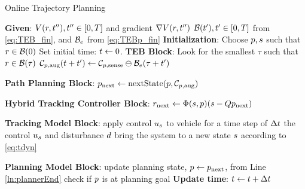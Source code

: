 \begin{algorithm}	
	\caption{Online Trajectory Planning}
	\label{alg:algOnline}
	\begin{algorithmic}[1]
		\STATE \textbf{Given}: \label{ln:gStart}
		\STATE $V(r, t''), t'' \in [0, T]$ and gradient $\nabla V(r, t'')$
 		\STATE $\mathcal B(t'), t' \in [0,T]$ from \eqref{eq:TEB_fin}, and $\mathcal B_e$ from \eqref{eq:TEBp_fin} \label{ln:gEnd}
    \STATE \textbf{Initialization}: \label{ln:Istart}
		\STATE Choose $p, s$ such that $r \in \mathcal B(0)$ 
    \STATE Set initial time: $t \leftarrow 0$. \label{ln:Iend}
		\STATE \textbf{TEB Block}: \label{ln:obsStart}
    \STATE Look for the smallest $\tau$ such that $r \in \mathcal B(\tau)$ \label{ln:infSkip}
		\STATE $\mathcal C_{p,\text{aug}}(t + t') \leftarrow \mathcal C_{p,\text{sense}} \ominus \mathcal B_e(\tau + t')$ \label{ln:obsEnd}
		
		\STATE \textbf{Path Planning Block}:\label{ln:plannerStart}
		\STATE $p_\text{next} \leftarrow \text{nextState}(p, \mathcal C_{p,\text{aug}})$\label{ln:plannerEnd}
		
		\STATE \textbf{Hybrid Tracking Controller Block}:\label{ln:controllerStart}
		\STATE $r_\text{next} \leftarrow \Phi(s,p)(s - Qp_\text{next})$
		
		\ELSE {} 
           \ENDIF \label{ln:controllerEnd}
		
		\STATE \textbf{Tracking Model Block}: \label{ln:trackingStart}
		\STATE apply control $u_s$ to vehicle for a time step of $\Delta t$
    \STATE the control $u_s$ and disturbance $d$ bring the system to a new state $s$ according to \eqref{eq:tdyn} \label{ln:trackingEnd}
		
		\STATE \textbf{Planning Model Block}:\label{ln:planningStart}
		\STATE update planning state, $p \leftarrow p_\text{next}$, from Line \ref{ln:plannerEnd}
		\STATE check if $p$ is at planning goal \label{ln:planningEnd}
    \STATE \textbf{Update time}:
    \STATE $t \leftarrow t + \Delta t$
		\ENDWHILE
	\end{algorithmic}
\end{algorithm}
